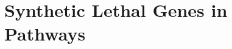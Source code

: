 



\FloatBarrier

\chapter{Synthetic Lethal Genes in Pathways}
\label{appendix:brca_networks}

\FloatBarrier

\iffalse
\begin{figure*}[!htp]
  \begin{center}
  \resizebox{1 \textwidth}{!}{
    \fbox{
    \texttt{[image: \{"/home/tomkelly/Downloads/Pathway\_Structure/graph\_plot\_Pi3K\_exprSL2".pdf]}}
   }
   }
   \end{center}
   \caption[Synthetic lethality in the PI3K Cascade]{\small \textbf{Synthetic lethality in the PI3K Cascade.} The Reactome PI3K Cascade pathway with synthetic lethal candidates, coloured as shown in the legend.
}
\label{fig:SL_Pathway_Pi3K}
\end{figure*}
\fi

